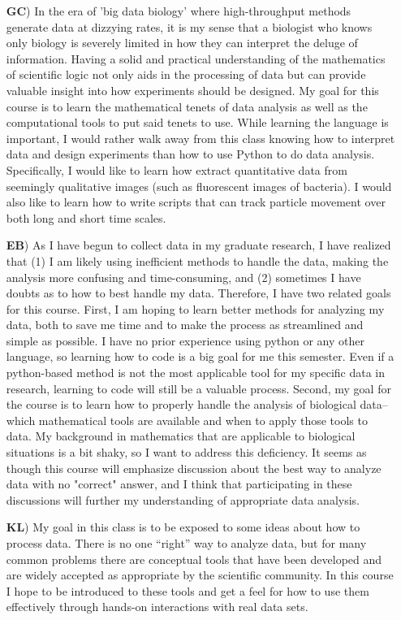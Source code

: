 \begin{itemize}
\item[\textbf{GC})] In the era of 'big data biology' where high-throughput
	methods generate data at dizzying rates, it is my sense that a
	biologist who knows only biology is severely limited in how they can
	interpret the deluge of information. Having a solid and practical
	understanding of the mathematics of scientific logic not only aids in
	the processing of data but can provide valuable insight into how
	experiments should be designed. My goal for this course is to
	learn the mathematical tenets of data analysis as well as the
	computational tools to put said tenets to use. While learning the
	language is important, I would rather walk away from this class
	knowing how to interpret data and design experiments than how
	to use Python to do data analysis. Specifically, I would like to learn
	how extract quantitative data from seemingly qualitative images (such
	as fluorescent images of bacteria). I would also like to learn how to
	write scripts that can track particle movement over both long and
	short time scales. 

\item[\textbf{EB})] As I have begun to collect data in my graduate research, I
	have realized that (1) I am likely using inefficient methods to handle
the data, making the analysis more confusing and time-consuming, and (2)
sometimes I have doubts as to how to best handle my data. Therefore, I have
two related goals for this course. First, I am hoping to learn better methods
for analyzing my data, both to save me time and to make the process as
streamlined and simple as possible. I have no prior experience using python or
any other language, so learning how to code is a big goal for me this
semester. Even if a python-based method is not the most applicable tool for my
specific data in research, learning to code will still be a valuable process.
Second, my goal for the course is to learn how to properly handle the analysis
of biological data-- which mathematical tools are available and when to apply
those tools to data. My background in mathematics that are applicable to
biological situations is a bit shaky, so I want to address this deficiency. It
seems as though this course will emphasize discussion about the best way to
analyze data with no "correct" answer, and I think that participating in these
discussions will further my understanding of appropriate data analysis.
	
\item[\textbf{KL})] My goal in this class is to be exposed to some ideas about how to process
data. There is no one ``right'' way to analyze data, but for many common
problems there are conceptual tools that have been developed and are widely
accepted as appropriate by the scientific community. In this course I hope to
be introduced to these tools and get a feel for how to use them effectively
through hands-on interactions with real data sets. 
\end{itemize}
\newpage
